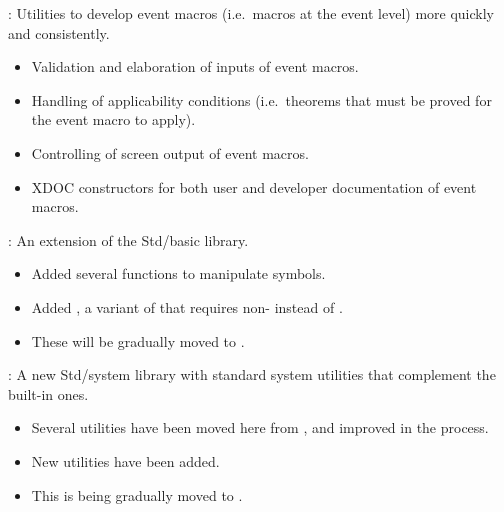 
\begin{frame}

\newlibtitle

:
Utilities to develop event macros (i.e.\ macros at the event level)
more quickly and consistently.
\begin{itemize}
\item
Validation and elaboration of inputs of event macros.
\item
Handling of applicability conditions
(i.e.\ theorems that must be proved for the event macro to apply).
\item
Controlling of screen output of event macros.
\item
XDOC constructors for both user and developer documentation of event macros.
\end{itemize}

\end{frame}


\begin{frame}

\newlibtitle

:
An extension of the Std/basic library.
\begin{itemize}
\item
Added several functions to manipulate symbols.
\item
Added , a variant of 
that requires non- instead of .
\item
These will be gradually moved to .
\end{itemize}

\separation

:
A new Std/system library
with standard system utilities
that complement the built-in ones.
\begin{itemize}
\item
Several utilities have been moved here from ,
and improved in the process.
\item
New utilities have been added.
\item
This is being gradually moved to .
\end{itemize}

\end{frame}


